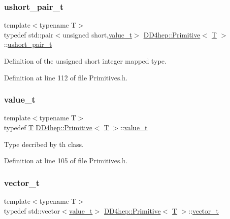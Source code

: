 \subsubsection{\texorpdfstring{ushort\+\_\+pair\+\_\+t}{ushort\_pair\_t}}
{\footnotesize\ttfamily template$<$typename T$>$ \\
typedef std\+::pair$<$unsigned short,\hyperlink{struct_d_d4hep_1_1_primitive_a0639e73bb8f07f99c2d8401f807a7af6}{value\+\_\+t}$>$ \hyperlink{struct_d_d4hep_1_1_primitive}{D\+D4hep\+::\+Primitive}$<$ \hyperlink{class_t}{T} $>$\+::\hyperlink{struct_d_d4hep_1_1_primitive_a17a1fe85259c15331aeaa9e4f3f25ac0}{ushort\+\_\+pair\+\_\+t}}



Definition of the unsigned short integer mapped type. 



Definition at line 112 of file Primitives.\+h.

\hypertarget{struct_d_d4hep_1_1_primitive_a0639e73bb8f07f99c2d8401f807a7af6}{}\label{struct_d_d4hep_1_1_primitive_a0639e73bb8f07f99c2d8401f807a7af6} 
\subsubsection{\texorpdfstring{value\+\_\+t}{value\_t}}
{\footnotesize\ttfamily template$<$typename T$>$ \\
typedef \hyperlink{class_t}{T} \hyperlink{struct_d_d4hep_1_1_primitive}{D\+D4hep\+::\+Primitive}$<$ \hyperlink{class_t}{T} $>$\+::\hyperlink{struct_d_d4hep_1_1_primitive_a0639e73bb8f07f99c2d8401f807a7af6}{value\+\_\+t}}



Type decribed by th class. 



Definition at line 105 of file Primitives.\+h.

\hypertarget{struct_d_d4hep_1_1_primitive_a811bb3e2e990b586cd6669ce73de1c50}{}\label{struct_d_d4hep_1_1_primitive_a811bb3e2e990b586cd6669ce73de1c50} 
\subsubsection{\texorpdfstring{vector\+\_\+t}{vector\_t}}
{\footnotesize\ttfamily template$<$typename T$>$ \\
typedef std\+::vector$<$\hyperlink{struct_d_d4hep_1_1_primitive_a0639e73bb8f07f99c2d8401f807a7af6}{value\+\_\+t}$>$ \hyperlink{struct_d_d4hep_1_1_primitive}{D\+D4hep\+::\+Primitive}$<$ \hyperlink{class_t}{T} $>$\+::\hyperlink{struct_d_d4hep_1_1_primitive_a811bb3e2e990b586cd6669ce73de1c50}{vector\+\_\+t}}



